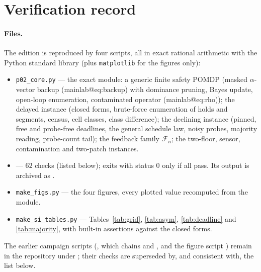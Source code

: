 \documentclass[11pt,a4paper]{article}
\makeatletter
\theoremstyle{plain}
\theoremstyle{definition}
\theoremstyle{remark}
\newcommand{\mref}[1]{\csname mainlab@#1\endcsname}
\newcommand{\meqref}[1]{(\mref{#1})}
\makeatother
\begin{document}
\section{Verification record}\label{si:verification}

\paragraph{Files.} The edition is reproduced by four scripts, all in exact rational arithmetic with the Python standard library (plus \texttt{matplotlib} for the figures only):
\begin{itemize}[leftmargin=1.6em,itemsep=1pt]
\item \texttt{p02\_core.py} --- the exact module: a generic finite safety POMDP (masked $\alpha$-vector backup \meqref{eq:backup} with dominance pruning, Bayes update, open-loop enumeration, contaminated operator \meqref{eq:rho}); the delayed instance (closed forms, brute-force enumeration of holds and segments, census, cell classes, class difference); the declining instance (pinned, free and probe-free deadlines, the general schedule law, noisy probes, majority reading, probe-count tail); the feedback family $\mathcal F_n$; the two-floor, sensor, contamination and two-patch instances.
\item {} --- $62$ checks (listed below); exits with status $0$ only if all pass. Its output is archived as .
\item \texttt{make\_figs.py} --- the four figures, every plotted value recomputed from the module.
\item \texttt{make\_si\_tables.py} --- Tables~\ref{tab:grid}, \ref{tab:asym}, \ref{tab:deadline} and \ref{tab:majority}, with built-in assertions against the closed forms.
\end{itemize}
The earlier campaign scripts (, which chains  and , and the figure script ) remain in the repository under ; their checks are superseded by, and consistent with, the list below.
\end{document}
